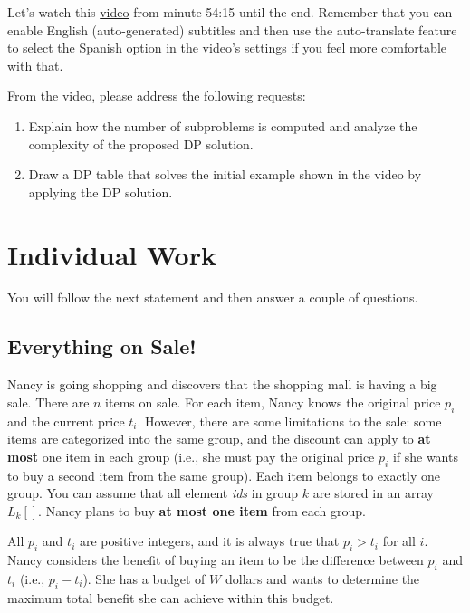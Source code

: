 \documentclass[12pt]{article}
\begin{document}
Let's watch this \href{https://ocw.mit.edu/courses/6-046j-design-and-analysis-of-algorithms-spring-2015/resources/lecture-10-dynamic-programming-advanced-dp/}{video} from minute 54:15 until the end. Remember that you can enable English (auto-generated) subtitles and then use the auto-translate feature to select the Spanish option in the video's settings if you feel more comfortable with that.

From the video, please address the following requests:

\begin{tcolorbox}[title=Exercises]
    \begin{enumerate}
        \item Explain how the number of subproblems is computed and analyze the complexity of the proposed DP solution.
        \item Draw a DP table that solves the initial example shown in the video by applying the DP solution.
    \end{enumerate}
\end{tcolorbox}

\section{Individual Work}
You will follow the next statement and then answer a couple of questions.

\subsection{Everything on Sale!}
Nancy is going shopping and discovers that the shopping mall is having a big sale. There are $n$ items on sale. For each item, Nancy knows the original price $p_i$ and the current price $t_i$. However, there are some limitations to the sale: some items are categorized into the same group, and the discount can apply to \textbf{at most} one item in each group (i.e., she must pay the original price $p_i$ if she wants to buy a second item from the same group). Each item belongs to exactly one group. You can assume that all element \textit{ids} in group $k$ are stored in an array $L_k []$. Nancy plans to buy \textbf{at most one item} from each group.

All $p_i$ and $t_i$ are positive integers, and it is always true that $p_i > t_i$ for all $i$. Nancy considers the benefit of buying an item to be the difference between $p_i$ and $t_i$ (i.e., $p_i - t_i$). She has a budget of $W$ dollars and wants to determine the maximum total benefit she can achieve within this budget.
\end{document}
